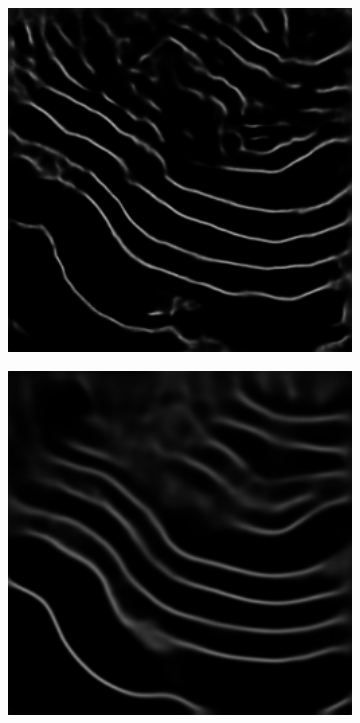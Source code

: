 \begin{figure}[!t]
    \centering
    \begin{subfigure}[t]{0.24\textwidth}
        \centering
        \includegraphics[width=1\textwidth, valign=c]{images/abl-none.png}
        \caption{}
    \end{subfigure}
    \begin{subfigure}[t]{0.24\textwidth}
        \centering
        \includegraphics[width=1\textwidth, valign=c]{images/abl-forward.png}

\end{subfigure}
\end{figure}
